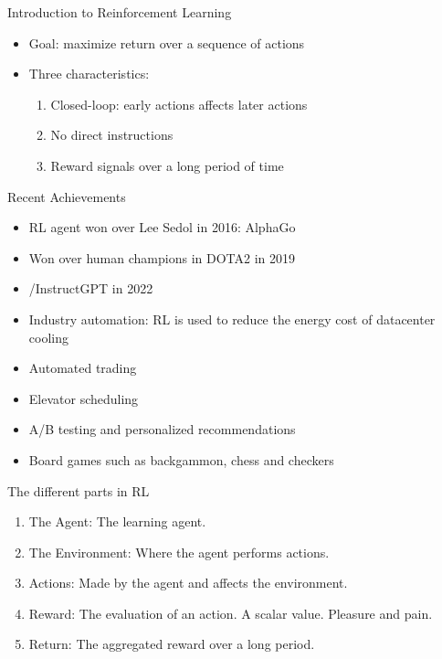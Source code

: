 \documentclass[10pt]{beamer}
\begin{document}
\begin{frame}{Introduction to Reinforcement Learning}

\begin{itemize}
\item {\color{uured} Goal}: maximize return over a sequence of actions\pause
\item Three characteristics:
\begin{enumerate}
\item Closed-loop: early actions affects later actions\pause
\item No direct instructions\pause
\item Reward signals over a long period of time
\end{enumerate}
\end{itemize}

\end{frame}



\begin{frame}{Recent Achievements}

\begin{itemize}
\item RL agent won over Lee Sedol in 2016: {\color{uured} AlphaGo}\pause
\item Won over human champions in {\color{uured} DOTA2} in 2019\pause
\item {}/InstructGPT in 2022\pause
\item Industry automation: RL is used to reduce the energy cost of datacenter cooling\pause
\item Automated trading\pause
\item Elevator scheduling\pause
\item A/B testing and personalized recommendations\pause
\item Board games such as backgammon, chess and checkers
\end{itemize}

\end{frame}



\begin{frame}{The different parts in RL}

\begin{enumerate}
\item The {\color{uured} Agent}: The learning agent. \pause
\item The {\color{uured} Environment}: Where the agent performs actions.\pause
\item {\color{uured} Actions}: Made by the agent and affects the environment.\pause
\item {\color{uured} Reward}: The evaluation of an action. A scalar value. Pleasure and pain.\pause
\item {\color{uured} Return}: The aggregated reward over a long period.
\end{enumerate}

\end{frame}
\end{document}
